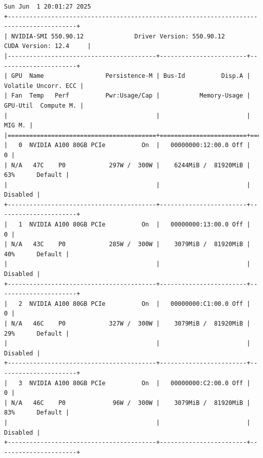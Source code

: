 \begin{verbatim}
Sun Jun  1 20:01:27 2025
+-----------------------------------------------------------------------------------------+
| NVIDIA-SMI 550.90.12              Driver Version: 550.90.12      CUDA Version: 12.4     |
|-----------------------------------------+------------------------+----------------------+
| GPU  Name                 Persistence-M | Bus-Id          Disp.A | Volatile Uncorr. ECC |
| Fan  Temp   Perf          Pwr:Usage/Cap |           Memory-Usage | GPU-Util  Compute M. |
|                                         |                        |               MIG M. |
|=========================================+========================+======================|
|   0  NVIDIA A100 80GB PCIe          On  |   00000000:12:00.0 Off |                    0 |
| N/A   47C    P0            297W /  300W |    6244MiB /  81920MiB |     63%      Default |
|                                         |                        |             Disabled |
+-----------------------------------------+------------------------+----------------------+
|   1  NVIDIA A100 80GB PCIe          On  |   00000000:13:00.0 Off |                    0 |
| N/A   43C    P0            285W /  300W |    3079MiB /  81920MiB |     40%      Default |
|                                         |                        |             Disabled |
+-----------------------------------------+------------------------+----------------------+
|   2  NVIDIA A100 80GB PCIe          On  |   00000000:C1:00.0 Off |                    0 |
| N/A   46C    P0            327W /  300W |    3079MiB /  81920MiB |     29%      Default |
|                                         |                        |             Disabled |
+-----------------------------------------+------------------------+----------------------+
|   3  NVIDIA A100 80GB PCIe          On  |   00000000:C2:00.0 Off |                    0 |
| N/A   46C    P0             96W /  300W |    3079MiB /  81920MiB |     83%      Default |
|                                         |                        |             Disabled |
+-----------------------------------------+------------------------+----------------------+


\end{verbatim}
